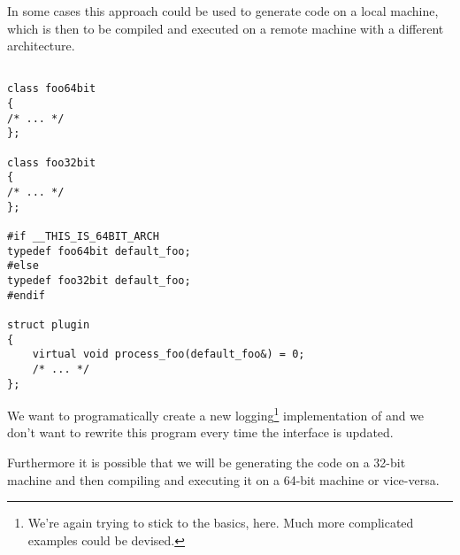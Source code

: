 In some cases this approach could be used to generate code on a local machine,
which is then to be compiled and executed on a remote machine with a different architecture.

\begin{verbatim}

class foo64bit
{
/* ... */
};

class foo32bit
{
/* ... */
};

#if __THIS_IS_64BIT_ARCH
typedef foo64bit default_foo;
#else
typedef foo32bit default_foo;
#endif

struct plugin
{
	virtual void process_foo(default_foo&) = 0;
	/* ... */
};

\end{verbatim}

We want to programatically create a new logging\footnote{
We're again trying to stick to the basics, here. Much more complicated
examples could be devised.
} implementation of \verb@plugin@
and we don't want to rewrite this program every time
the interface is updated.

Furthermore it is possible that we will be generating the code
on a 32-bit machine and then compiling and executing it on a 64-bit machine
or vice-versa.

